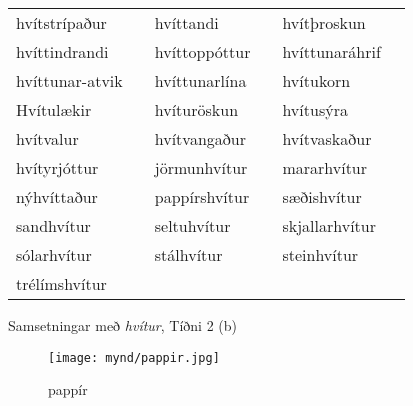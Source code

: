 \documentclass{../litmal.tex}{subfiles}
\begin{document}
\begin{wordlist}[H]
\begin{tcolorbox}

	\setlength{\extrarowheight}{3pt}
	\begin{tabular}{BlBlBl}	
		hvítstrípaður		&	\phantom{ba} 	& 
		hvíttandi			&	\phantom{ba} 	& 
		hvítþroskun		&	\phantom{ba} 	\\ 
		hvíttindrandi		&		& 
		hvíttoppóttur		&		& 	
		hvíttunaráhrif		&		\\ 	
		hvíttunar-atvik		&		& 	
		hvíttunarlína		&		& 	
		hvítukorn			&		\\ 
		Hvítulækir			&		& 	
		hvíturöskun		&		& 	
		hvítusýra			&		\\ 
		hvítvalur			&		& 
		hvítvangaður		&		& 
		hvítvaskaður		&		\\ 
		hvítyrjóttur		&		& 	
		jörmunhvítur		&		& 	
		mararhvítur		&		\\ 
		nýhvíttaður		&		& 		
		pappírshvítur		&		& 
		sæðishvítur		&		\\ 	
		sandhvítur		&		& 	
		seltuhvítur		&		& 
		skjallarhvítur		&		\\ 
		sólarhvítur		&		& 
		stálhvítur			&		& 
		steinhvítur		& 		\\ 
		trélímshvítur		&		& 
						&		&
						&
	\end{tabular}

\end{tcolorbox}
	\caption{Samsetningar með \textit{hvítur}, Tíðni 2 (b)}
	\label{listi:hvitt:2b}
\end{wordlist}

\begin{figure}[H]
\begin{tcolorbox}
\centering
	\texttt{[image: mynd/pappir.jpg]}
\end{tcolorbox}
	\caption{pappír}
	\label{mynd:pappir}
\end{figure}
\end{document}
